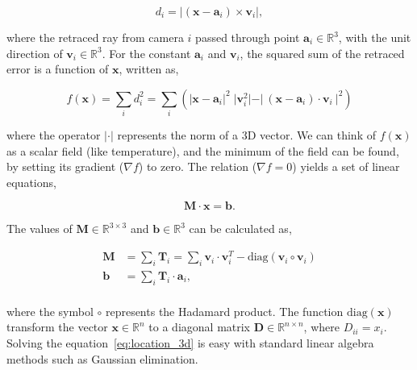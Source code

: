 \documentclass[11pt,twoside]{report}
\begin{document}
\begin{equation}
	\label{eq:retrace_err}
	d_i = \vert
	(\mathbf{x} - \mathbf{a}_i) \times \mathbf{v}_i
	\vert,
\end{equation}


\noindent where the retraced ray from camera $i$ passed through point $\mathbf{a}_i \in \mathbb{R}^3$, with the unit direction of $\mathbf{v}_i \in \mathbb{R}^3$. For the constant $\mathbf{a}_i$ and $\mathbf{v}_i$, the squared sum of the retraced error is a function of $\mathbf{x}$, written as,

$$
f(\mathbf{x}) = \sum_i{d_i^2} 
= \sum_i{\left( \vert \mathbf{x} - \mathbf{a}_i \vert^2 \; \vert \mathbf{v}_i^2 \vert - 
\vert \ (\mathbf{x} - \mathbf{a}_i) \cdot \mathbf{v}_i\ \vert^2 \right)}
$$

\noindent where the operator $\vert \cdot \vert$ represents the norm of a 3D vector. We can think of $f(\mathbf{x})$ as a scalar field (like temperature), and the minimum of the field can be found, by setting its gradient ($\nabla f$) to zero. The relation ($\nabla f = 0$) yields a set of linear equations,

\begin{equation}
	\label{eq:location_3d}
	\mathbf{M} \cdot \mathbf{x} = \mathbf{b}.	
\end{equation}

\noindent The values of $\mathbf{M} \in \mathbb{R}^{3 \times 3}$ and $\mathbf{b} \in \mathbb{R}^3$ can be calculated as,

$$
\begin{aligned}
\mathbf{M} &= \sum_i{\mathbf{T}_i} = \sum_i{
\mathbf{v}_i \cdot \mathbf{v}_i^T - 
\textrm{diag}(\mathbf{v}_i \circ \mathbf{v}_i)
} \\
\mathbf{b} &= \sum_i{
\mathbf{T}_i \cdot \mathbf{a}_i,
} \\
\end{aligned}
$$

\noindent where the symbol $\circ$ represents the Hadamard product. The function $\textrm{diag}(\mathbf{x})$ transform the vector $\mathbf{x} \in \mathbb{R}^n$ to a diagonal matrix $\mathbf{D} \in \mathbb{R}^{n \times n}$, where $D_{ii} = x_i$. Solving the equation~\ref{eq:location_3d} is easy with standard linear algebra methods such as Gaussian elimination.
\end{document}
